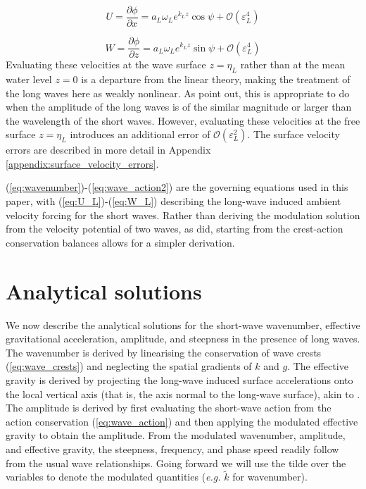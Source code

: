 \documentclass[lineno]{jfm}
\begin{document}
\begin{equation}
\label{eq:U_L}
U =
\frac{\partial \phi}{\partial x} =
a_L \omega_L e^{k_L z} \cos{\psi} + \mathcal{O}(\varepsilon_L^4)
\end{equation}

\begin{equation}
\label{eq:W_L}
W =
\frac{\partial \phi}{\partial z} =
a_L \omega_L e^{k_L z} \sin{\psi} + \mathcal{O}(\varepsilon_L^4)
\end{equation}
Evaluating these velocities at the wave surface $z = \eta_L$ rather than at
the mean water level $z=0$ is a departure from the linear theory, making the
treatment of the long waves here as weakly nonlinear.
As \citet{zhang1990evolution} point out, this is appropriate to do when the
amplitude of the long waves is of the similar magnitude or larger than the
wavelength of the short waves.
However, evaluating these velocities at the free surface $z = \eta_L$ introduces
an additional error of $\mathcal{O}(\varepsilon_L^2)$.
The surface velocity errors are described in more detail in Appendix
\ref{appendix:surface_velocity_errors}.

(\ref{eq:wavenumber})-(\ref{eq:wave_action2}) are the governing equations used
in this paper, with (\ref{eq:U_L})-(\ref{eq:W_L}) describing the long-wave
induced ambient velocity forcing for the short waves. 
Rather than deriving the modulation solution from the velocity
potential of two waves, as \citet{longuet1960changes} did, starting from the
crest-action conservation balances allows for a simpler derivation.

\section{Analytical solutions}
\label{section:analytical_solutions}

We now describe the analytical solutions for the short-wave wavenumber,
effective gravitational acceleration, amplitude, and steepness in the presence
of long waves.
The wavenumber is derived by linearising the conservation of wave crests
(\ref{eq:wave_crests}) and neglecting the spatial gradients of $k$ and $g$.
The effective gravity is derived by projecting the long-wave induced surface
accelerations onto the local vertical axis (that is, the axis normal to the
long-wave surface), akin to \citet{zhang1990evolution}.
The amplitude is derived by first evaluating the short-wave action from the
action conservation (\ref{eq:wave_action}) and then applying the modulated
effective gravity to obtain the amplitude.
From the modulated wavenumber, amplitude, and effective gravity, the steepness,
frequency, and phase speed readily follow from the usual wave relationships.
Going forward we will use the tilde over the variables to denote the modulated
quantities (\textit{e.g.} $\widetilde{k}$ for wavenumber).
\end{document}
